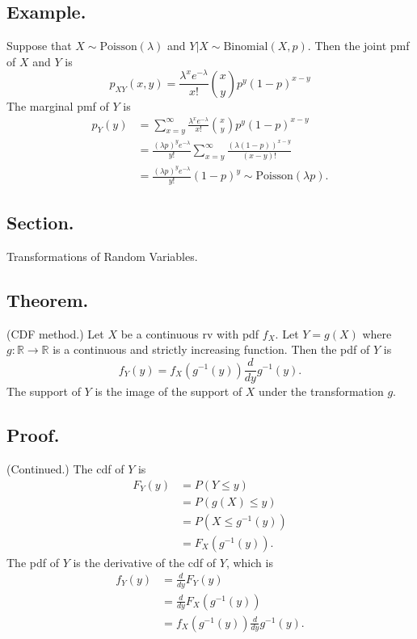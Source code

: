 \documentclass[titlepage]{article}
\begin{document}
\subsection{Example.} Suppose that $X \sim \text{Poisson}(\lambda)$ and $Y|X \sim \text{Binomial}(X, p)$. Then the joint pmf of $X$ and $Y$ is
$$p_{XY}(x, y) = \frac{\lambda^{x}e^{-\lambda}}{x!}\binom{x}{y}p^{y}(1-p)^{x-y}$$
The marginal pmf of $Y$ is 
\begin{align*}
    p_{Y}(y) &= \sum_{x=y}^{\infty}\frac{\lambda^{x}e^{-\lambda}}{x!}\binom{x}{y}p^{y}(1-p)^{x-y} \\
             &= \frac{(\lambda p)^{y}e^{-\lambda}}{y!}\sum_{x=y}^{\infty}\frac{(\lambda(1-p))^{x-y}}{(x-y)!} \\
             &= \frac{(\lambda p)^{y}e^{-\lambda}}{y!}(1-p)^{y} \sim \text{Poisson}(\lambda p).
\end{align*}

\newpage {}

\subsection{Section.} Transformations of Random Variables.

\subsection{Theorem.} (CDF method.) Let $X$ be a continuous rv with pdf $f_{X}$. Let $Y = g(X)$ where $g: \mathbb{R} \to \mathbb{R}$ is a continuous and strictly increasing function. Then the pdf of $Y$ is 
$$f_{Y}(y) = f_{X}(g^{-1}(y))\frac{d}{dy}g^{-1}(y).$$
The support of $Y$ is the image of the support of $X$ under the transformation $g$.

\subsection{Proof.} (Continued.) The cdf of $Y$ is 
\begin{align*}
    F_{Y}(y) &= P(Y \leq y) \\
             &= P(g(X) \leq y) \\
             &= P(X \leq g^{-1}(y)) \\
             &= F_{X}(g^{-1}(y)).
\end{align*}
The pdf of $Y$ is the derivative of the cdf of $Y$, which is 
\begin{align*}
    f_{Y}(y) &= \frac{d}{dy}F_{Y}(y) \\
             &= \frac{d}{dy}F_{X}(g^{-1}(y)) \\
             &= f_{X}(g^{-1}(y))\frac{d}{dy}g^{-1}(y).
\end{align*}
\end{document}
